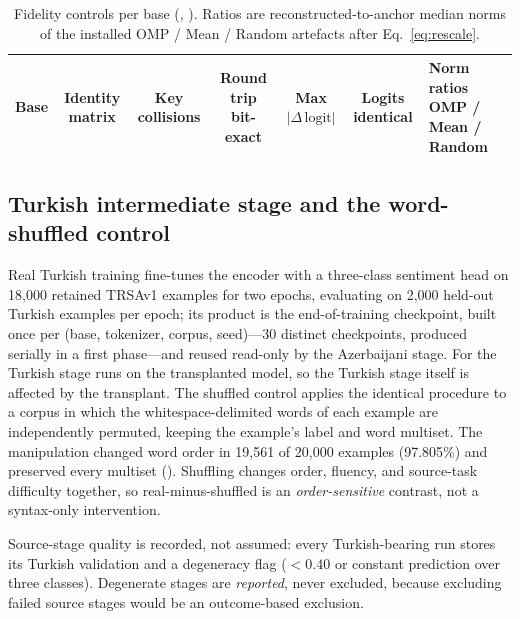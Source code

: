 \begin{table}[!t]
\caption{Fidelity controls per base (, ). Ratios are reconstructed-to-anchor median norms of the installed OMP / Mean / Random artefacts after Eq.~\eqref{eq:rescale}.}
\label{tab:fidelity}
\centering
\footnotesize
\begin{tabular}{@{}lcccccl@{}}
\toprule
Base & Identity matrix & Key collisions & Round trip bit-exact & Max $|\Delta\,\mathrm{logit}|$ & Logits identical & Norm ratios OMP / Mean / Random \\
\midrule

\end{tabular}
\end{table}

\subsection{Turkish intermediate stage and the word-shuffled control}
\label{sec:method:turkish}
Real Turkish training fine-tunes the encoder with a three-class sentiment head on 18{,}000 retained TRSAv1 examples \cite{aydogan2023trsav1} for two epochs, evaluating on 2{,}000 held-out Turkish examples per epoch; its product is the end-of-training checkpoint, built once per (base, tokenizer, corpus, seed)---30 distinct checkpoints, produced serially in a first phase---and reused read-only by the Azerbaijani stage. For \OMPTR{} the Turkish stage runs on the transplanted model, so the Turkish stage itself is affected by the transplant. The shuffled control applies the identical procedure to a corpus in which the whitespace-delimited words of each example are independently permuted, keeping the example's label and word multiset. The manipulation changed word order in 19{,}561 of 20{,}000 examples (97.805\%) and preserved every multiset (). Shuffling changes order, fluency, and source-task difficulty together, so real-minus-shuffled is an \emph{order-sensitive} contrast, not a syntax-only intervention.

Source-stage quality is recorded, not assumed: every Turkish-bearing run stores its Turkish validation \Fone{} and a degeneracy flag (\Fone{}$<0.40$ or constant prediction over three classes). Degenerate stages are \emph{reported}, never excluded, because excluding failed source stages would be an outcome-based exclusion.

